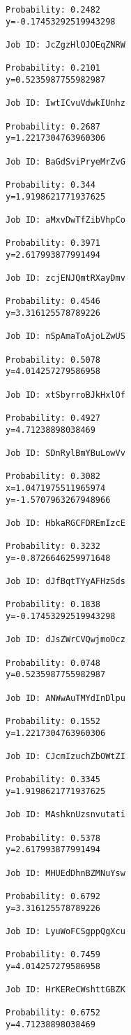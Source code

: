 \documentclass[11pt]{article}
\begin{document}
\begin{Verbatim}[commandchars=\\\{\}]
Probability: 0.2482
y=-0.17453292519943298

Job ID: JcZgzHlOJOEqZNRW

Probability: 0.2101
y=0.5235987755982987

Job ID: IwtICvuVdwkIUnhz

Probability: 0.2687
y=1.2217304763960306

Job ID: BaGdSviPryeMrZvG

Probability: 0.344
y=1.9198621771937625

Job ID: aMxvDwTfZibVhpCo

Probability: 0.3971
y=2.617993877991494

Job ID: zcjENJQmtRXayDmv

Probability: 0.4546
y=3.316125578789226

Job ID: nSpAmaToAjoLZwUS

Probability: 0.5078
y=4.014257279586958

Job ID: xtSbyrroBJkHxlOf

Probability: 0.4927
y=4.71238898038469

Job ID: SDnRylBmYBuLowVv

Probability: 0.3082
x=1.0471975511965974
y=-1.5707963267948966

Job ID: HbkaRGCFDREmIzcE

Probability: 0.3232
y=-0.8726646259971648

Job ID: dJfBqtTYyAFHzSds

Probability: 0.1838
y=-0.17453292519943298

Job ID: dJsZWrCVQwjmoOcz

Probability: 0.0748
y=0.5235987755982987

Job ID: ANWwAuTMYdInDlpu

Probability: 0.1552
y=1.2217304763960306

Job ID: CJcmIzuchZbOWtZI

Probability: 0.3345
y=1.9198621771937625

Job ID: MAshknUzsnvutati

Probability: 0.5378
y=2.617993877991494

Job ID: MHUEdDhnBZMNuYsw

Probability: 0.6792
y=3.316125578789226

Job ID: LyuWoFCSgppQgXcu

Probability: 0.7459
y=4.014257279586958

Job ID: HrKEReCWshttGBZK

Probability: 0.6752
y=4.71238898038469


\end{Verbatim}
\end{document}
